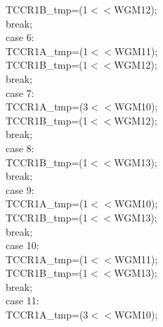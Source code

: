 \documentclass[titlepage, a4paper, 10pt, reqno, openany]{report}
\begin{document}
\begin{minipage}[t]{.35\linewidth}
	\hspace*{1.5cm}			TCCR1B\_tmp=(1$<<$WGM12); \\
	\hspace*{1.5cm}			break; \\
	\hspace*{1cm}		case 6: \\
	\hspace*{1.5cm}			TCCR1A\_tmp=(1$<<$WGM11); \\
	\hspace*{1.5cm}			TCCR1B\_tmp=(1$<<$WGM12); \\
	\hspace*{1.5cm}			break; \\
	\hspace*{1cm}		case 7: \\
	\hspace*{1.5cm}			TCCR1A\_tmp=(3$<<$WGM10); \\
	\hspace*{1.5cm}			TCCR1B\_tmp=(1$<<$WGM12); \\
	\hspace*{1.5cm}			break; \\
	\hspace*{1cm}		case 8: \\
	\hspace*{1.5cm}			TCCR1B\_tmp=(1$<<$WGM13); \\
	\hspace*{1.5cm}			break; \\
	\hspace*{1cm}		case 9: \\
	\hspace*{1.5cm}			TCCR1A\_tmp=(1$<<$WGM10); \\
	\hspace*{1.5cm}			TCCR1B\_tmp=(1$<<$WGM13); \\
	\hspace*{1.5cm}			break; \\
	\hspace*{1cm}		case 10: \\
	\hspace*{1.5cm}			TCCR1A\_tmp=(1$<<$WGM11); \\
	\hspace*{1.5cm}			TCCR1B\_tmp=(1$<<$WGM13); \\
	\hspace*{1.5cm}			break; \\
	\hspace*{1cm}		case 11: \\
	\hspace*{1.5cm}			TCCR1A\_tmp=(3$<<$WGM10); \\

\end{minipage}
\end{document}
